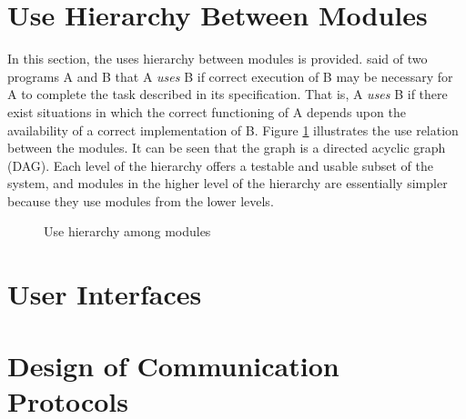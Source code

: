 \documentclass[12pt, titlepage]{article}
\begin{document}
\section{Use Hierarchy Between Modules} \label{SecUse}

In this section, the uses hierarchy between modules is
provided. \citet{Parnas1978} said of two programs A and B that A {\em uses} B if
correct execution of B may be necessary for A to complete the task described in
its specification. That is, A {\em uses} B if there exist situations in which
the correct functioning of A depends upon the availability of a correct
implementation of B.  Figure \ref{FigUH} illustrates the use relation between
the modules. It can be seen that the graph is a directed acyclic graph
(DAG). Each level of the hierarchy offers a testable and usable subset of the
system, and modules in the higher level of the hierarchy are essentially simpler
because they use modules from the lower levels.



\begin{figure}[H]
\centering
\caption{Use hierarchy among modules}
\label{FigUH}
\end{figure}


\section{User Interfaces}


\section{Design of Communication Protocols}
\end{document}
